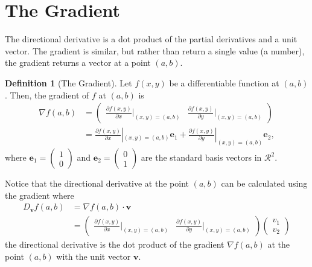 \documentclass[
]{book}
\theoremstyle{definition}
\newtheorem{definition}{Definition}[chapter]
\theoremstyle{definition}
\theoremstyle{definition}
\theoremstyle{remark}
\begin{document}
\hypertarget{the-gradient}{%
\section{The Gradient}\label{the-gradient}}

The directional derivative is a dot product of the partial derivatives and a unit vector. The gradient is similar, but rather than return a single value (a number), the gradient returns a vector at a point \((a, b)\).

\begin{definition}[The Gradient]
\protect\hypertarget{def:unnamed-chunk-289}{}{\label{def:unnamed-chunk-289} {} }Let \(f(x, y)\) be a differentiable function at \((a, b)\). Then, the gradient of \(f\) at \((a, b)\) is
\[
\begin{aligned}
\nabla f(a, b) & = \begin{pmatrix} \frac{\partial f(x, y)}{\partial x}|_{(x,y) = (a, b)} & \frac{\partial f(x, y)}{\partial y}|_{(x,y) = (a, b)} \end{pmatrix} \\
 & = \frac{\partial f(x, y)}{\partial x}|_{(x,y) = (a, b)} \mathbf{e}_1 + \frac{\partial f(x, y)}{\partial y}|_{(x,y) = (a, b)} \mathbf{e}_2,
\end{aligned}
\]
where \(\mathbf{e}_1 = \begin{pmatrix} 1 \\ 0 \end{pmatrix}\) and \(\mathbf{e}_2 = \begin{pmatrix} 0 \\ 1 \end{pmatrix}\) are the standard basis vectors in \(\mathcal{R}^2\).
\end{definition}

Notice that the directional derivative at the point \((a , b)\) can be calculated using the gradient where
\[
\begin{aligned}
D_{\mathbf{v}} f(a, b) & = \nabla f(a, b) \cdot \mathbf{v} \\
& = \begin{pmatrix} \frac{\partial f(x, y)}{\partial x}|_{(x,y) = (a, b)} & \frac{\partial f(x, y)}{\partial y}|_{(x,y) = (a, b)} \end{pmatrix} \begin{pmatrix} v_1 \\ v_2 \end{pmatrix}
\end{aligned}
\]
the directional derivative is the dot product of the gradient \(\nabla f(a, b)\) at the point \((a, b)\) with the unit vector \(\mathbf{v}\).
\end{document}
